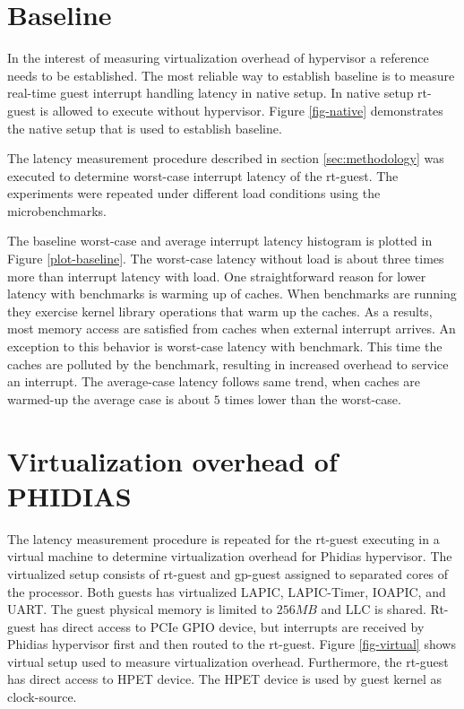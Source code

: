 \section{Baseline}
In the interest of measuring virtualization overhead of hypervisor a reference needs to be established. 
The most reliable way to establish baseline is to measure real-time guest interrupt handling latency
in native setup. In native setup rt-guest is allowed to execute without hypervisor. Figure \ref{fig-native}
demonstrates the native setup that is used to establish baseline.


The latency measurement procedure described in section \ref{sec:methodology} was executed to determine worst-case interrupt latency
of the rt-guest. The experiments were repeated under different load conditions using the microbenchmarks.


The baseline worst-case and average interrupt latency histogram is plotted in Figure \ref{plot-baseline}.
The worst-case latency without load is about three times more than interrupt latency with load. 
One straightforward reason for lower latency with benchmarks is warming up of caches.
When benchmarks are running they exercise kernel library operations that warm up the caches. 
As a results, most memory access are satisfied from caches when external interrupt arrives.
An exception to this behavior is worst-case latency with \mcachepressure{} benchmark.
This time the caches are polluted by the benchmark, resulting in increased overhead to service an interrupt.
The average-case latency follows same trend, when caches are warmed-up the average case is about $5$ times lower than the worst-case.

\section{Virtualization overhead of PHIDIAS} \label{sec:virtual-overhead}
The latency measurement procedure is repeated for the rt-guest 
executing in a virtual machine to determine virtualization overhead for Phidias hypervisor.
The virtualized setup consists of rt-guest and gp-guest assigned to separated cores of the processor.
Both guests has virtualized LAPIC, LAPIC-Timer, IOAPIC, and UART.
The guest physical memory is limited to $256MB$ and LLC is shared.
Rt-guest has direct access to  PCIe GPIO device, 
but interrupts are received by Phidias hypervisor first and then routed to the rt-guest.
Figure \ref{fig-virtual} shows virtual setup used to measure virtualization overhead.
Furthermore, the rt-guest has direct access to HPET device. 
The HPET device is used by guest kernel as clock-source.

